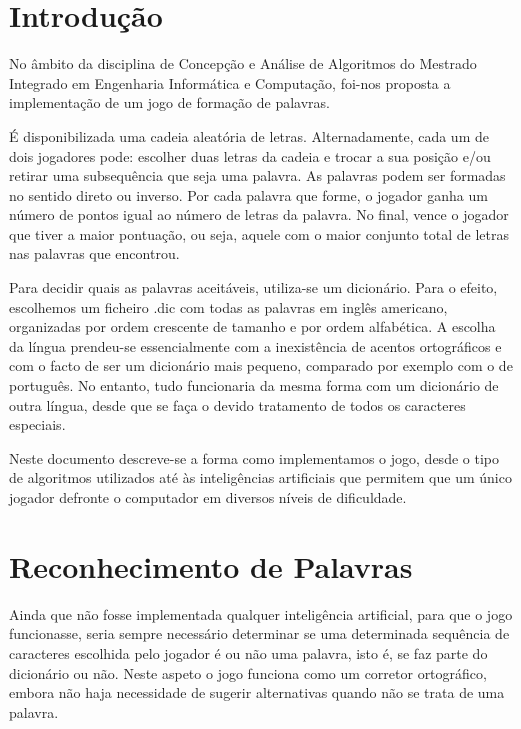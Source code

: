 \documentclass[12pt,a4paper,reqno]{report}
\numberwithin{equation}{section}
\begin{document}


\tableofcontents


\chapter{Introdução}

No âmbito da disciplina de Concepção e Análise de Algoritmos do Mestrado Integrado em Engenharia Informática e Computação, foi-nos proposta a implementação de um jogo de formação de palavras.

É disponibilizada uma cadeia aleatória de letras. Alternadamente, cada um de dois jogadores pode: escolher duas letras da cadeia e trocar a sua posição e/ou retirar uma subsequência que seja uma palavra. As palavras podem ser formadas no sentido direto ou inverso. Por cada palavra que forme, o jogador ganha um número de pontos igual ao número de letras da palavra. No final, vence o jogador que tiver a maior pontuação, ou seja, aquele com o maior conjunto total de letras nas palavras que encontrou.

Para decidir quais as palavras aceitáveis, utiliza-se um dicionário. Para o efeito, escolhemos um ficheiro .dic com todas as palavras em inglês americano, organizadas por ordem crescente de tamanho e por ordem alfabética. A escolha da língua prendeu-se essencialmente com a inexistência de acentos ortográficos e com o facto de ser um dicionário mais pequeno, comparado por exemplo com o de português. No entanto, tudo funcionaria da mesma forma com um dicionário de outra língua, desde que se faça o devido tratamento de todos os caracteres especiais.

Neste documento descreve-se a forma como implementamos o jogo, desde o tipo de algoritmos utilizados até às inteligências artificiais que permitem que um único jogador defronte o computador em diversos níveis de dificuldade.

\chapter{Reconhecimento de Palavras}

Ainda que não fosse implementada qualquer inteligência artificial, para que o jogo funcionasse, seria sempre necessário determinar se uma determinada sequência de caracteres escolhida pelo jogador é ou não uma palavra, isto é, se faz parte do dicionário ou não. Neste aspeto o jogo funciona como um corretor ortográfico, embora não haja necessidade de sugerir alternativas quando não se trata de uma palavra.
\end{document}

